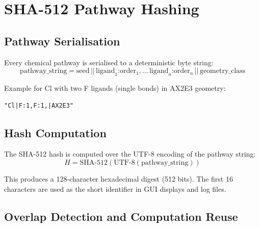 \documentclass[11pt,a4paper]{article}
\begin{document}
\section{SHA-512 Pathway Hashing}
\label{sec:hashing}

\subsection{Pathway Serialisation}

Every chemical pathway is serialised to a deterministic byte string:
\begin{equation}
  \text{pathway\_string} = \text{seed} \,||\, \text{ligand}_1\text{:order}_1\text{,}
    \,\ldots\, \text{ligand}_n\text{:order}_n \,||\, \text{geometry\_class}
\end{equation}

Example for Cl with two F ligands (single bonds) in AX2E3 geometry:
\begin{lstlisting}[title={\textbf{Pathway serialisation example}}]
"Cl|F:1,F:1,|AX2E3"
\end{lstlisting}

\subsection{Hash Computation}

The SHA-512 hash is computed over the UTF-8 encoding of the pathway string:
\begin{equation}
  H = \text{SHA-512}(\text{UTF-8}(\text{pathway\_string}))
\end{equation}

This produces a 128-character hexadecimal digest (512 bits).  The first
16 characters are used as the short identifier in GUI displays and log files.

\subsection{Overlap Detection and Computation Reuse}

\begin{center}
\end{center}
\end{document}
